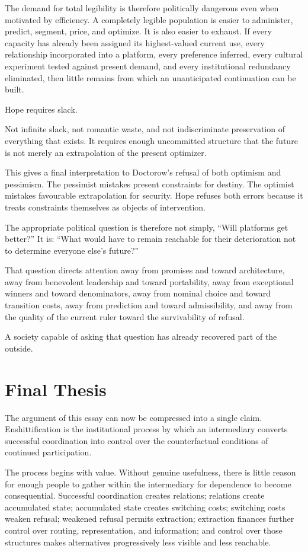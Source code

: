 \documentclass[11pt]{article}
\begin{document}
The demand for total legibility is therefore politically dangerous even when motivated by efficiency. A completely legible population is easier to administer, predict, segment, price, and optimize. It is also easier to exhaust. If every capacity has already been assigned its highest-valued current use, every relationship incorporated into a platform, every preference inferred, every cultural experiment tested against present demand, and every institutional redundancy eliminated, then little remains from which an unanticipated continuation can be built.

Hope requires slack.

Not infinite slack, not romantic waste, and not indiscriminate preservation of everything that exists. It requires enough uncommitted structure that the future is not merely an extrapolation of the present optimizer.

This gives a final interpretation to Doctorow's refusal of both optimism and pessimism. The pessimist mistakes present constraints for destiny. The optimist mistakes favourable extrapolation for security. Hope refuses both errors because it treats constraints themselves as objects of intervention.

The appropriate political question is therefore not simply, ``Will platforms get better?'' It is: ``What would have to remain reachable for their deterioration not to determine everyone else's future?''

That question directs attention away from promises and toward architecture, away from benevolent leadership and toward portability, away from exceptional winners and toward denominators, away from nominal choice and toward transition costs, away from prediction and toward admissibility, and away from the quality of the current ruler toward the survivability of refusal.

A society capable of asking that question has already recovered part of the outside.

\section{Final Thesis}

The argument of this essay can now be compressed into a single claim. Enshittification is the institutional process by which an intermediary converts successful coordination into control over the counterfactual conditions of continued participation.

The process begins with value. Without genuine usefulness, there is little reason for enough people to gather within the intermediary for dependence to become consequential. Successful coordination creates relations; relations create accumulated state; accumulated state creates switching costs; switching costs weaken refusal; weakened refusal permits extraction; extraction finances further control over routing, representation, and information; and control over those structures makes alternatives progressively less visible and less reachable.
\end{document}
